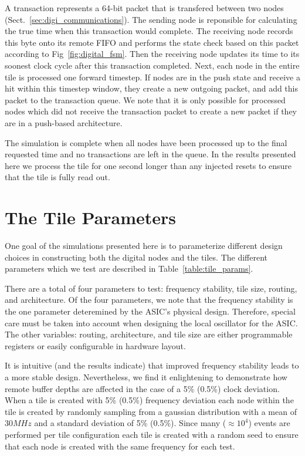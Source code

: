 A transaction represents a 64-bit packet that is transfered between two nodes (Sect.~\ref{sec:digi_communications}).
The sending node is reponsible for calculating the true time when this transaction would complete.
The receiving node records this byte onto its remote FIFO and performs the state check based on this packet according to Fig~\ref{fig:digital_fsm}.
Then the receiving node updates its time to its soonest clock cycle after this transaction completed.
Next, each node in the entire tile is processed one forward timestep.
If nodes are in the push state and receive a hit within this timestep window, they create a new outgoing packet, and add this packet to the transaction queue.
We note that it is only possible for processed nodes which did not receive the transaction packet to create a new packet if they are in a push-based architecture. 

The simulation is complete when all nodes have been processed up to the final requested time and no transactions are left in the queue. 
In the results presented here we process the tile for one second longer than any injected resets to ensure that the tile is fully read out.


\section{The Tile Parameters}

One goal of the simulations presented here is to parameterize different design choices in constructing both the digital nodes and the tiles.
The different parameters which we test are described in Table~\ref{table:tile_params}.

There are a total of four parameters to test: frequency stability, tile size, routing, and architecture.
Of the four parameters, we note that the frequency stability is the one parameter deteremined by the ASIC's physical design.
Therefore, special care must be taken into account when designing the local oscillator for the ASIC.
The other variables: routing, architecture, and tile size are either programmable registers or easily configurable in hardware layout.

It is intuitive (and the results indicate) that improved frequency stability leads to a more stable design.
Nevertheless, we find it enlightening to demonstrate how remote buffer depths are affected in the case of a 5\% (0.5\%) clock deviation.
When a tile is created with 5\% (0.5\%) frequency deviation each node within the tile is created by randomly sampling from a gaussian distribution with a mean of 30$\unit{MHz}$ and a standard deviation of 5\% (0.5\%).
Since many ($\approx 10^4$) events are performed per tile configuration each tile is created with a random seed to ensure that each node is created with the same frequency for each test.

